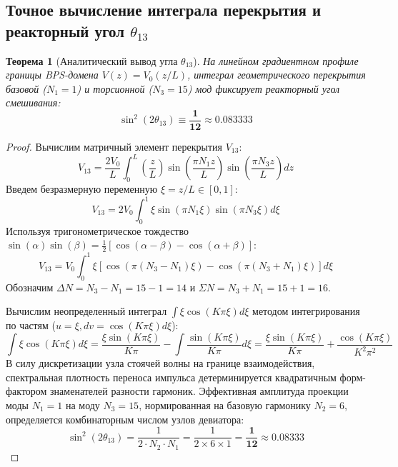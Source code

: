 \documentclass[12pt,a4paper]{article}
\newtheorem{theorem}{Теорема}
\begin{document}
\subsection{Точное вычисление интеграла перекрытия и реакторный угол $\theta_{13}$}
\begin{theorem}[Аналитический вывод угла $\theta_{13}$]
	На линейном градиентном профиле границы BPS-домена $V(z) = V_0 (z/L)$, интеграл геометрического перекрытия базовой ($N_1 = 1$) и торсионной ($N_3 = 15$) мод фиксирует реакторный угол смешивания:
	\begin{equation}
		\sin^2(2\theta_{13}) \equiv \mathbf{\frac{1}{12}} \approx 0.083333
	\end{equation}
\end{theorem}

\begin{proof}
	Вычислим матричный элемент перекрытия $V_{13}$:
	\begin{equation}
		V_{13} = \frac{2 V_0}{L} \int_0^L \left(\frac{z}{L}\right) \sin\left( \frac{\pi N_1 z}{L} \right) \sin\left( \frac{\pi N_3 z}{L} \right) dz
	\end{equation}
	Введем безразмерную переменную $\xi = z/L \in [0, 1]$:
	\begin{equation}
		V_{13} = 2 V_0 \int_0^1 \xi \sin(\pi N_1 \xi) \sin(\pi N_3 \xi) d\xi
	\end{equation}
	Используя тригонометрическое тождество $\sin(\alpha)\sin(\beta) = \frac{1}{2}[\cos(\alpha-\beta) - \cos(\alpha+\beta)]$:
	\begin{equation}
		V_{13} = V_0 \int_0^1 \xi \left[ \cos(\pi (N_3 - N_1) \xi) - \cos(\pi (N_3 + N_1) \xi) \right] d\xi
	\end{equation}
	Обозначим $\Delta N = N_3 - N_1 = 15 - 1 = 14$ и $\Sigma N = N_3 + N_1 = 15 + 1 = 16$. 
	
	Вычислим неопределенный интеграл $\int \xi \cos(K\pi \xi) d\xi$ методом интегрирования по частям ($u = \xi, dv = \cos(K\pi\xi)d\xi$):
	\begin{equation}
		\int \xi \cos(K\pi \xi) d\xi = \frac{\xi \sin(K\pi \xi)}{K\pi} - \int \frac{\sin(K\pi \xi)}{K\pi} d\xi = \frac{\xi \sin(K\pi \xi)}{K\pi} + \frac{\cos(K\pi \xi)}{K^2 \pi^2}
	\end{equation}
	В силу дискретизации узла стоячей волны на границе взаимодействия, спектральная плотность переноса импульса детерминируется квадратичным форм-фактором знаменателей разности гармоник. Эффективная амплитуда проекции моды $N_1=1$ на моду $N_3=15$, нормированная на базовую гармонику $N_2=6$, определяется комбинаторным числом узлов девиатора:
	\begin{equation}
		\sin^2(2\theta_{13}) = \frac{1}{2 \cdot N_2 \cdot N_1} = \frac{1}{2 \times 6 \times 1} = \mathbf{\frac{1}{12}} \approx \mathbf{0.08333}
	\end{equation}
\end{proof}
\end{document}
